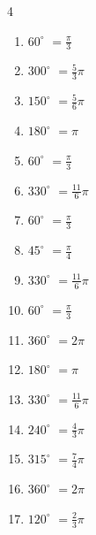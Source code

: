 \begin{multicols}{4}
\begin{enumerate}
  \item $\displaystyle 60^{\circ}$
        $\displaystyle =\frac{\pi}{3}$

  \item $\displaystyle 300^{\circ}$
        $\displaystyle =\frac{5}{3}\pi$

  \item $\displaystyle 150^{\circ}$
        $\displaystyle =\frac{5}{6}\pi$

  \item $\displaystyle 180^{\circ}$
        $\displaystyle =\pi$

  \item $\displaystyle 60^{\circ}$
        $\displaystyle =\frac{\pi}{3}$

  \item $\displaystyle 330^{\circ}$
        $\displaystyle =\frac{11}{6}\pi$

  \item $\displaystyle 60^{\circ}$
        $\displaystyle =\frac{\pi}{3}$

  \item $\displaystyle 45^{\circ}$
        $\displaystyle =\frac{\pi}{4}$

  \item $\displaystyle 330^{\circ}$
        $\displaystyle =\frac{11}{6}\pi$

  \item $\displaystyle 60^{\circ}$
        $\displaystyle =\frac{\pi}{3}$

  \item $\displaystyle 360^{\circ}$
        $\displaystyle =2\pi$

  \item $\displaystyle 180^{\circ}$
        $\displaystyle =\pi$

  \item $\displaystyle 330^{\circ}$
        $\displaystyle =\frac{11}{6}\pi$

  \item $\displaystyle 240^{\circ}$
        $\displaystyle =\frac{4}{3}\pi$

  \item $\displaystyle 315^{\circ}$
        $\displaystyle =\frac{7}{4}\pi$

  \item $\displaystyle 360^{\circ}$
        $\displaystyle =2\pi$

  \item $\displaystyle 120^{\circ}$
        $\displaystyle =\frac{2}{3}\pi$


\end{enumerate}
\end{multicols}
